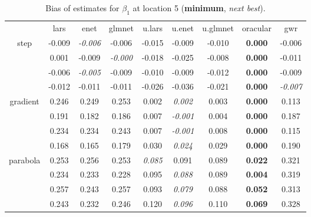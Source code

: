 \documentclass[authoryear, review, 11pt]{elsarticle}
\begin{document}
\begin{table}[ht]
\begin{center}
\begin{tabular}{ccccccccc}
  & lars & enet & glmnet & u.lars & u.enet & u.glmnet & oracular & gwr \\ 
  \cline{2-9}
  \multirow{4}{*}{step} & -0.009 & \emph{-0.006} & -0.006 & -0.015 & -0.009 & -0.010 & \textbf{0.000} & -0.006 \\ 
  & 0.001 & -0.009 & \emph{-0.000} & -0.018 & -0.025 & -0.008 & \textbf{0.000} & -0.011 \\ 
  & -0.006 & \emph{-0.005} & -0.009 & -0.010 & -0.009 & -0.012 & \textbf{0.000} & -0.009 \\ 
  & -0.012 & -0.011 & -0.011 & -0.026 & -0.036 & -0.021 & \textbf{0.000} & \emph{-0.007} \\ 
  \cline{2-9}
  \multirow{4}{*}{gradient} & 0.246 & 0.249 & 0.253 & 0.002 & \emph{0.002} & 0.003 & \textbf{0.000} & 0.113 \\ 
  & 0.191 & 0.182 & 0.186 & 0.007 & \emph{-0.001} & 0.004 & \textbf{0.000} & 0.187 \\ 
  & 0.234 & 0.234 & 0.243 & 0.007 & \emph{-0.001} & 0.008 & \textbf{0.000} & 0.115 \\ 
  & 0.168 & 0.165 & 0.179 & 0.030 & \emph{0.024} & 0.029 & \textbf{0.000} & 0.190 \\ 
  \cline{2-9}
  \multirow{4}{*}{parabola} & 0.253 & 0.256 & 0.253 & \emph{0.085} & 0.091 & 0.089 & \textbf{0.022} & 0.321 \\ 
  & 0.234 & 0.233 & 0.228 & 0.095 & \emph{0.088} & 0.089 & \textbf{0.004} & 0.319 \\ 
  & 0.257 & 0.243 & 0.257 & 0.093 & \emph{0.079} & 0.088 & \textbf{0.052} & 0.313 \\ 
  & 0.243 & 0.232 & 0.246 & 0.120 & \emph{0.096} & 0.110 & \textbf{0.069} & 0.328 \\ 
  \end{tabular}
\caption{Bias of estimates for $\beta_1$ at location 5 (\textbf{minimum}, \emph{next best}).\label{table:loc5-X1-BiasX}}
\end{center}
\end{table}
\end{document}
